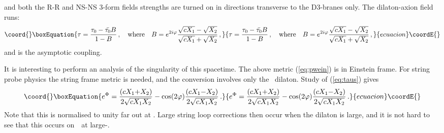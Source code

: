 \documentclass[a4paper,12pt]{amsproc}
\numberwithin{equation}{section}
\def\gs{g_{\rm{s}}}
\def\detn{\myHighlight{$d{=}10$}\coordHE{}}
\def\vtpt{\myHighlight{$\vartheta=\pi/2$}\coordHE{}\,}
\begin{document}
%
and both the R-R and NS-NS 3-form fields strengths are turned on in
directions transverse to the D3-branes only.  The dilaton-axion field
\myHighlight{$\tau$}\coordHE{} runs:
%
\begin{equation}\coord{}\boxEquation{\label{eq:taus}
\tau = {{\tau_0-{\bar{\tau_0}}B}\over{1-B}} \,, 
\quad{\rm where}\quad B = e^{2i\varphi} 
{{\sqrt{cX_1}-\sqrt{X_2}}\over{\sqrt{cX_1}+\sqrt{X_2}}} \,,
}{\tau = {{\tau_0-{\bar{\tau_0}}B}\over{1-B}} \,, 
\quad{\rm where}\quad B = e^{2i\varphi} 
{{\sqrt{cX_1}-\sqrt{X_2}}\over{\sqrt{cX_1}+\sqrt{X_2}}} \,,
}{ecuacion}\coordE{}\end{equation}
%
and \myHighlight{$\tau_0=i/\gs+\theta_s/(2\pi)$}\coordHE{} is the asymptotic coupling.  

It is interesting to perform an analysis of the singularity of this
spacetime.  The above metric (\ref{eq:pwein}) is in Einstein frame.
For string probe physics the string frame metric is needed, and the
conversion \coordHE{} involves only the
\detn\ dilaton.  Study of (\ref{eq:taus}) gives
%
\begin{equation}\coord{}\boxEquation{
e^\Phi = {{(cX_1{+}X_2)}\over{2\sqrt{cX_1X_2}}}-
\cos(2\varphi){{(cX_1{-}X_2)}\over{2\sqrt{cX_1X_2}}} \,.
}{
e^\Phi = {{(cX_1{+}X_2)}\over{2\sqrt{cX_1X_2}}}-
\cos(2\varphi){{(cX_1{-}X_2)}\over{2\sqrt{cX_1X_2}}} \,.
}{ecuacion}\coordE{}\end{equation}
%
Note that this is normalised to unity far out at \coordHE{}.  Large string
loop corrections then occur when the dilaton is large, and it is not
hard to see that this occurs on \vtpt\ at large-\coordHE{}.
\end{document}
